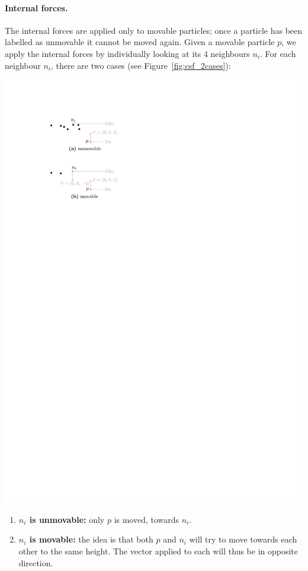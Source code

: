 %

\paragraph{Internal forces.}
The internal forces are applied only to movable particles; once a particle has been labelled as unmovable it cannot be moved again.
Given a movable particle $p$, we apply the internal forces by individually looking at its 4 neighbours $n_i$.
For each neighbour $n_i$, there are two cases (see Figure~\ref{fig:csf_2cases}):
\begin{marginfigure}
  \centering
  \includegraphics[width=\linewidth]{csf_2cases}
  \caption{}%
\label{fig:csf_2cases}
\end{marginfigure}
\begin{enumerate}
  \item \textbf{$n_i$ is unmovable:} only $p$ is moved, towards $n_i$. 
  \item \textbf{$n_i$ is movable:} the idea is that both $p$ and $n_i$ will try to move towards each other to the same height. The vector applied to each will thus be in opposite direction. 
\end{enumerate}

